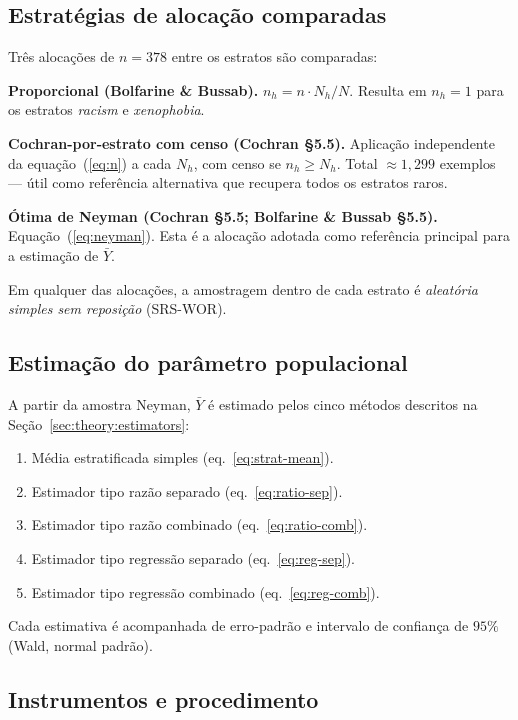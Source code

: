 \subsection{Estratégias de alocação comparadas}
\label{sec:method:allocation}

Três alocações de $n=378$ entre os estratos são comparadas:

\textbf{Proporcional (Bolfarine \& Bussab).} $n_h = n \cdot N_h/N$. Resulta
em $n_h = 1$ para os estratos \textit{racism} e \textit{xenophobia}.

\textbf{Cochran-por-estrato com censo (Cochran §5.5).} Aplicação
independente da equação~(\ref{eq:n}) a cada $N_h$, com censo se
$n_h \geq N_h$. Total $\approx 1{,}299$ exemplos --- útil como referência
alternativa que recupera todos os estratos raros.

\textbf{Ótima de Neyman (Cochran §5.5; Bolfarine \& Bussab §5.5).}
Equação~(\ref{eq:neyman}). Esta é a alocação adotada como referência
principal para a estimação de $\bar{Y}$.

Em qualquer das alocações, a amostragem dentro de cada estrato é
\textit{aleatória simples sem reposição} (SRS-WOR).

\subsection{Estimação do parâmetro populacional}

A partir da amostra Neyman, $\bar{Y}$ é estimado pelos cinco métodos descritos
na Seção~\ref{sec:theory:estimators}:
\begin{enumerate}
  \item Média estratificada simples (eq.~\ref{eq:strat-mean}).
  \item Estimador tipo razão separado (eq.~\ref{eq:ratio-sep}).
  \item Estimador tipo razão combinado (eq.~\ref{eq:ratio-comb}).
  \item Estimador tipo regressão separado (eq.~\ref{eq:reg-sep}).
  \item Estimador tipo regressão combinado (eq.~\ref{eq:reg-comb}).
\end{enumerate}
Cada estimativa é acompanhada de erro-padrão e intervalo de confiança de
$95\%$ (Wald, normal padrão).

\subsection{Instrumentos e procedimento}

